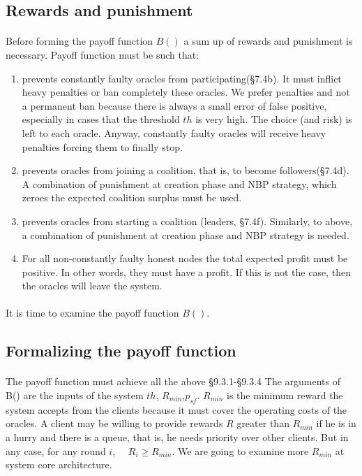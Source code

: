 \documentclass{article}
\begin{document}
{\subsection{Rewards and punishment}
\paragraph{ }
Before forming the payoff function $B()$ a sum up of rewards and punishment is necessary. Payoff function must be such that:\\
\begin{enumerate}
\item prevents constantly faulty oracles from participating(§7.4b). It must inflict heavy penalties or ban completely these oracles. We prefer penalties and not a permanent ban because there is always a small error of false positive, especially in cases that the threshold $th$ is very high. The choice (and risk) is left to each oracle. Anyway, constantly faulty oracles will receive heavy penalties forcing them to finally stop.
\item prevents oracles from joining a coalition, that is, to become followers(§7.4d). A combination of punishment at creation phase and NBP strategy, which zeroes the expected coalition surplus must be used.
\item prevents oracles from starting a coalition (leaders, §7.4f). Similarly, to above, a combination of punishment at creation phase and NBP strategy is needed.
\item For all non-constantly faulty honest nodes the total expected profit must be positive. In other words, they must have a profit. If this is not the case, then the oracles will leave the system.
\end{enumerate}
\paragraph{ }
It is time to examine the payoff function $B()$.

\subsection{Formalizing the payoff function}
\paragraph{ }
The payoff function must achieve all the above §9.3.1-§9.3.4
The arguments of B() are the inputs of the system $th$, $R_{min}$,$p_{sf}$. $R_{min}$ is the minimum reward the system accepts from the clients because it must cover the operating costs of the oracles. A client may be willing to provide rewards $R$ greater than $R_{min}$ if he is in a hurry and there is a queue, that is, he needs priority over other clients. But in any case, for any round $i$,~~ $R_i\geq R_{min}$. We are going to examine more $R_{min}$ at system core architecture.
}
\end{document}
